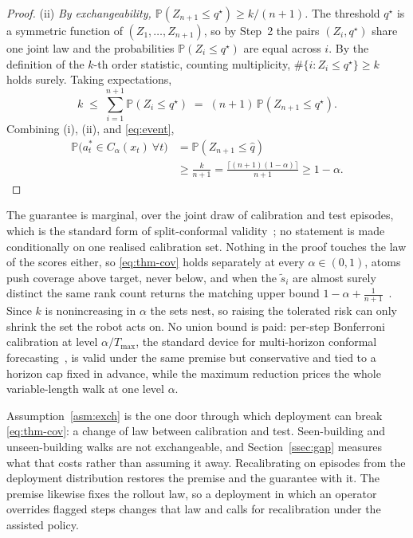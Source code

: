 \begin{proof}
(ii) \emph{By exchangeability, $\mathbb{P}(Z_{n+1}\leq q^\star)\geq
k/(n+1)$.} The threshold $q^\star$ is a symmetric function of
$(Z_1,\dots,Z_{n+1})$, so by Step~2 the pairs $(Z_i,q^\star)$ share one joint
law and the probabilities $\mathbb{P}(Z_i\leq q^\star)$ are equal across
$i$. By the definition of the $k$-th order statistic, counting multiplicity,
$\#\{i:Z_i\leq q^\star\}\geq k$ holds surely. Taking expectations,
\[
k\;\leq\;\sum_{i=1}^{n+1}\mathbb{P}(Z_i\leq q^\star)
\;=\;(n+1)\,\mathbb{P}(Z_{n+1}\leq q^\star).
\]
Combining (i), (ii), and \eqref{eq:event},
\begin{align*}
\mathbb{P}\big(a^*_t\in C_\alpha(x_t)\ \forall t\big)
&=\mathbb{P}(Z_{n+1}\leq\hat q)\\
&\geq\frac{k}{n+1}
=\frac{\lceil(n+1)(1-\alpha)\rceil}{n+1}
\geq 1-\alpha .
\end{align*}

\end{proof}

The guarantee is marginal, over the joint draw of calibration and test
episodes, which is the standard form of split-conformal
validity~\cite{lei2018distributionfree}; no statement is made conditionally
on one realised calibration set. Nothing in the proof touches the law of
the scores either, so \eqref{eq:thm-cov} holds separately at every
$\alpha\in(0,1)$, atoms push coverage above target, never below, and when
the $\tilde s_i$ are almost surely distinct the same rank count returns the
matching upper bound
$1-\alpha+\tfrac{1}{n+1}$~\cite{vovk2005alrw,lei2018distributionfree,tibshirani2019covariateshift}.
Since $k$ is nonincreasing in $\alpha$ the sets nest, so raising the
tolerated risk can only shrink the set the robot acts on. No union bound is
paid: per-step Bonferroni calibration at level $\alpha/T_{\max}$, the
standard device for multi-horizon conformal
forecasting~\cite{stankeviciute2021cfrnn}, is valid under the same premise
but conservative and tied to a horizon cap fixed in advance, while the
maximum reduction prices the whole variable-length walk at one level
$\alpha$.

\begin{remark}
\label{rem:premise}
Assumption~\ref{asm:exch} is the one door through which deployment can
break \eqref{eq:thm-cov}: a change of law between calibration and
test. Seen-building and unseen-building walks are not
exchangeable, and Section~\ref{ssec:gap} measures what that costs rather than
assuming it away. Recalibrating on episodes from the deployment distribution
restores the premise and the guarantee with it. The premise likewise fixes
the rollout law, so a deployment in which an operator overrides flagged
steps changes that law and calls for recalibration under the assisted
policy.
\end{remark}

